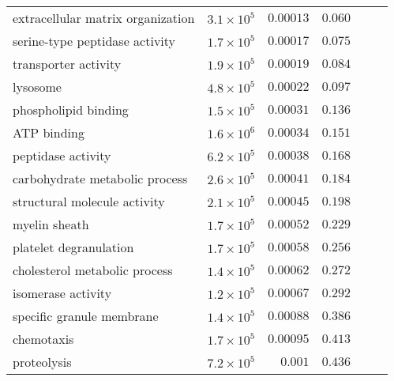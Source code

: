 \begin{longtable*}{|l|r|r|r|r|r|}
    extracellular matrix organization         & $3.1\times 10^{5}$ & $0.00013$            & $ 0.060~~$                      \\
    serine-type peptidase activity            & $1.7\times 10^{5}$ & $0.00017$            & $ 0.075~~$                      \\
    transporter activity                      & $1.9\times 10^{5}$ & $0.00019$            & $ 0.084~~$                      \\
    lysosome                                  & $4.8\times 10^{5}$ & $0.00022$            & $ 0.097~~$                      \\
    phospholipid binding                      & $1.5\times 10^{5}$ & $0.00031$            & $ 0.136~~$                      \\
    ATP binding                               & $1.6\times 10^{6}$ & $0.00034$            & $ 0.151~~$                      \\
    peptidase activity                        & $6.2\times 10^{5}$ & $0.00038$            & $ 0.168~~$                      \\
    carbohydrate metabolic process            & $2.6\times 10^{5}$ & $0.00041$            & $ 0.184~~$                      \\
    structural molecule activity              & $2.1\times 10^{5}$ & $0.00045$            & $ 0.198~~$                      \\
    myelin sheath                             & $1.7\times 10^{5}$ & $0.00052$            & $ 0.229~~$                      \\
    platelet degranulation                    & $1.7\times 10^{5}$ & $0.00058$            & $ 0.256~~$                      \\
    cholesterol metabolic process             & $1.4\times 10^{5}$ & $0.00062$            & $ 0.272~~$                      \\
    isomerase activity                        & $1.2\times 10^{5}$ & $0.00067$            & $ 0.292~~$                      \\
    specific granule membrane                 & $1.4\times 10^{5}$ & $0.00088$            & $ 0.386~~$                      \\
    chemotaxis                                & $1.7\times 10^{5}$ & $0.00095$            & $ 0.413~~$                      \\
    proteolysis                               & $7.2\times 10^{5}$ & $ 0.001$             & $ 0.436~~$                      \\

\end{longtable*}
